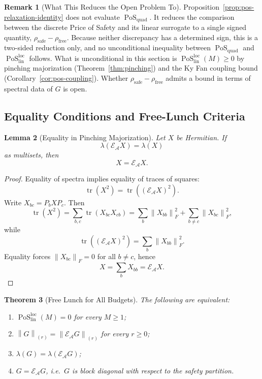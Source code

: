\documentclass[12pt]{article}
\newtheorem{theorem}{Theorem}[section]
\newtheorem{lemma}[theorem]{Lemma}
\theoremstyle{definition}
\newtheorem{remark}[theorem]{Remark}
\DeclareMathOperator{\tr}{tr}
\DeclareMathOperator{\PoS}{PoS}
\newcommand{\norm}[1]{\left\lVert#1\right\rVert}
\newcommand{\EA}{\mathcal E_{\mathcal A}}
\newcommand{\KyF}[2]{\left\|#1\right\|_{(#2)}}
\newcommand{\PoSlin}{\PoS_{\mathrm{lin}}^{\mathrm{loc}}}
\newcommand{\PoSquad}{\PoS_{\mathrm{quad}}}
\begin{document}
\begin{remark}[What This Reduces the Open Problem To]
\label{rem:pos-reduction}
Proposition~\ref{prop:pos-relaxation-identity} does not evaluate $\PoSquad$.
It reduces the comparison between the discrete Price of Safety and its linear
surrogate to a single signed quantity,
$\rho_{\mathrm{safe}}-\rho_{\mathrm{free}}$.  Because neither discrepancy has a
determined sign, this is a two-sided reduction only, and no unconditional
inequality between $\PoSquad$ and $\PoSlin$ follows.  What is unconditional in
this section is $\PoSlin(M)\ge0$ by pinching majorization
(Theorem~\ref{thm:pinching}) and the Ky Fan coupling bound
(Corollary~\ref{cor:pos-coupling}).  Whether
$\rho_{\mathrm{safe}}-\rho_{\mathrm{free}}$ admits a bound in terms of spectral
data of $G$ is open.
\end{remark}

\subsection{Equality Conditions and Free-Lunch Criteria}
\label{subsec:pos-equality}

\begin{lemma}[Equality in Pinching Majorization]
\label{lem:equality-pinching}
Let $X$ be Hermitian.  If
\[
\lambda(\EA X)=\lambda(X)
\]
as multisets, then
\[
X=\EA X.
\]
\end{lemma}

\begin{proof}
Equality of spectra implies equality of traces of squares:
\[
\tr(X^2)=\tr((\EA X)^2).
\]
Write $X_{bc}=P_bXP_c$.  Then
\[
\tr(X^2)
=
\sum_{b,c}\tr(X_{bc}X_{cb})
=
\sum_b
\norm{X_{bb}}_F^2
+
\sum_{b\neq c}
\norm{X_{bc}}_F^2,
\]
while
\[
\tr((\EA X)^2)
=
\sum_b
\norm{X_{bb}}_F^2.
\]
Equality forces $\norm{X_{bc}}_F=0$ for all $b\neq c$, hence
\[
X=\sum_bX_{bb}=\EA X.
\]
\end{proof}

\begin{theorem}[Free Lunch for All Budgets]
\label{thm:pos-allM}
The following are equivalent:
\begin{enumerate}[label=(\roman*)]
\item $\PoSlin(M)=0$ for every $M\ge1$;
\item $\KyF{G}{r}=\KyF{\EA G}{r}$ for every $r\ge0$;
\item $\lambda(G)=\lambda(\EA G)$;
\item $G=\EA G$, i.e.\ $G$ is block diagonal with respect to the safety
partition.
\end{enumerate}
\end{theorem}
\end{document}
